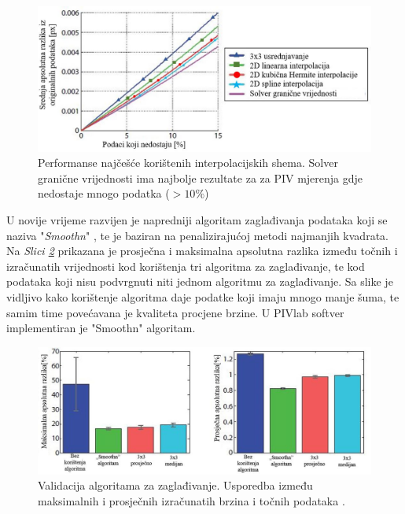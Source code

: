 \begin{figure}[h]  
	\centering
	\includegraphics[width=14cm]{./2_DPIV/2_14PrefInterpolacije.jpg} 
	\caption{Performanse najčešće korištenih interpolacijskih shema. Solver granične vrijednosti ima najbolje rezultate za za PIV mjerenja gdje nedostaje mnogo podatka ($>10\%$) \cite{thielicke2014_phd}}
	\label{sl:2.14}
\end{figure}
\par
U novije vrijeme razvijen je napredniji algoritam zaglađivanja podataka koji se naziva "\textit{Smoothn}" \cite{garcia2010robust}, te je baziran na penalizirajućoj metodi najmanjih kvadrata. Na \textit{Slici \ref{sl:2.15}} prikazana je prosječna i maksimalna apsolutna razlika između točnih i izračunatih vrijednosti kod korištenja tri algoritma za zaglađivanje, te kod podataka koji nisu podvrgnuti niti jednom algoritmu za zaglađivanje. Sa slike je vidljivo kako korištenje algoritma daje podatke koji imaju mnogo manje šuma, te samim time povećavana je kvaliteta procjene brzine.
U PIVlab softver implementiran je "Smoothn" algoritam.
\begin{figure}[h]  
	\centering
	\includegraphics[width=16cm]{./2_DPIV/2_15AlgoritmiZaZagladivanje.jpg} 
	\caption{Validacija algoritama za zaglađivanje. Usporedba između maksimalnih i prosječnih izračunatih brzina i točnih podataka \cite{thielicke2014_phd}.}
	\label{sl:2.15}
\end{figure}
\FloatBarrier
